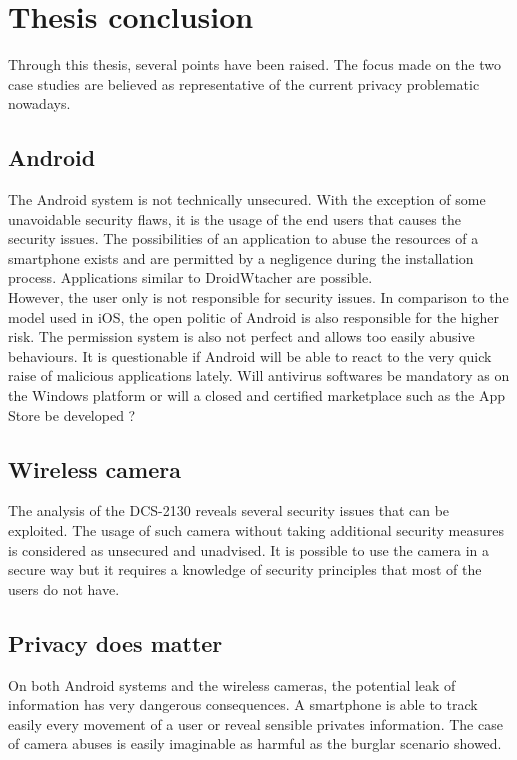\chapter{Thesis conclusion}

Through this thesis, several points have been raised.
The focus made on the two case studies are believed as representative of the current privacy problematic nowadays.

\section{Android}

The Android system is not technically unsecured.
With the exception of some unavoidable security flaws, it is the usage of the end users that causes the security issues.
The possibilities of an application to abuse the resources of a smartphone exists and are permitted by a negligence during the installation process.
Applications similar to DroidWtacher are possible.\\

However, the user only is not responsible for security issues.
In comparison to the model used in iOS, the open politic of Android is also responsible for the higher risk.
The permission system is also not perfect and allows too easily abusive behaviours.
It is questionable if Android will be able to react to the very quick raise of malicious applications lately.
Will antivirus softwares be mandatory as on the Windows platform or will a closed and certified marketplace such as the App Store be developed ?

\section{Wireless camera}

The analysis of the DCS-2130 reveals several security issues that can be exploited.
The usage of such camera without taking additional security measures is  considered as unsecured and unadvised.
It is possible to use the camera in a secure way but it requires a knowledge of security principles that most of the users do not have.

\section{Privacy does matter}

On both Android systems and the wireless cameras, the potential leak of information has very dangerous consequences.
A smartphone is able to track easily every movement of a user or reveal sensible privates information.
The case of camera abuses is easily imaginable as harmful as the burglar scenario showed.\\

